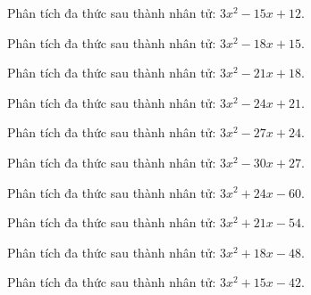 \begin{bt}
	Phân tích đa thức sau thành nhân tử: $3 x^2 - 15 x + 12$.
\end{bt}
\begin{bt}
	Phân tích đa thức sau thành nhân tử: $3 x^2 - 18 x + 15$.
\end{bt}
\begin{bt}
	Phân tích đa thức sau thành nhân tử: $3 x^2 - 21 x + 18$.
\end{bt}
\begin{bt}
	Phân tích đa thức sau thành nhân tử: $3 x^2 - 24 x + 21$.
\end{bt}
\begin{bt}
	Phân tích đa thức sau thành nhân tử: $3 x^2 - 27 x + 24$.
\end{bt}
\begin{bt}
	Phân tích đa thức sau thành nhân tử: $3 x^2 - 30 x + 27$.
\end{bt}
\begin{bt}
	Phân tích đa thức sau thành nhân tử: $3 x^2 + 24 x - 60$.
\end{bt}
\begin{bt}
	Phân tích đa thức sau thành nhân tử: $3 x^2 + 21 x - 54$.
\end{bt}
\begin{bt}
	Phân tích đa thức sau thành nhân tử: $3 x^2 + 18 x - 48$.
\end{bt}
\begin{bt}
	Phân tích đa thức sau thành nhân tử: $3 x^2 + 15 x - 42$.
\end{bt}
